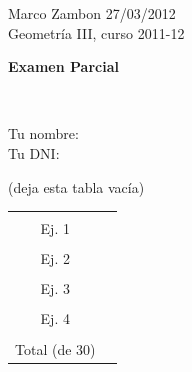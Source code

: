 \documentclass[12pt,a4paper]{report}
\theoremstyle{definition}
\begin{document}
\noindent
{\sffamily\large Marco Zambon 
\hfill     27/03/2012\\Geometr\'ia III, curso 2011-12}
 

\begin{center}\bfseries\large\textsf{Examen Parcial    \vspace{-2mm}}
\end{center}

 

\noindent
\hrulefill{}\\

\noindent
{\sffamily\large Tu nombre:
\\
Tu DNI: 

}


 
\begin{center}{\sffamily (deja esta tabla vac\'ia)}
\end{center}
\vspace*{-5mm}
 

\begin{table}[htdp]
\begin{center}
\begin{tabular}{|c|p{2cm} |}
\hline
&\\[-0.2cm]
Ej. 1  &\\[0.2cm]
\hline
&\\[-0.2cm]
Ej. 2  &\\[0.2cm]
\hline
&\\[-0.2cm]
Ej. 3  &\\[0.2cm]
\hline
&\\[-0.2cm]
Ej. 4  &\\[0.2cm]
\hline\hline
&\\[-0.2cm]
Total (de 30) & \\[0.2cm]
\hline
\end{tabular}
\end{center}
\label{default}
\end{table}
\vspace*{-5mm}
\end{document}
